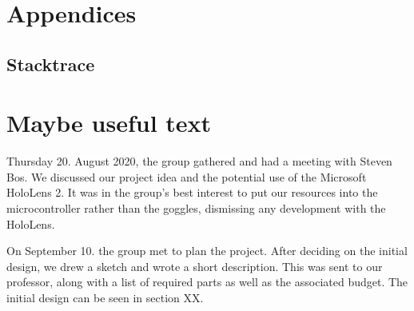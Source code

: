 \documentclass{article}
\begin{document}
\newpage
\section{Appendices}

\subsection{Stacktrace}






\newpage
\section{Maybe useful text}

Thursday 20. August 2020, the group gathered and had a meeting with Steven Bos. We discussed our project idea and the potential use of the Microsoft HoloLens 2. It was in the group's best interest to put our resources into the microcontroller rather than the goggles, dismissing any development with the HoloLens.

\vspace{5mm}
On September 10. the group met to plan the project. After deciding on the initial design, we drew a sketch and wrote a short description. This was sent to our professor, along with a list of required parts as well as the associated budget. The initial design can be seen in section XX.

\vspace{5mm}
\end{document}
